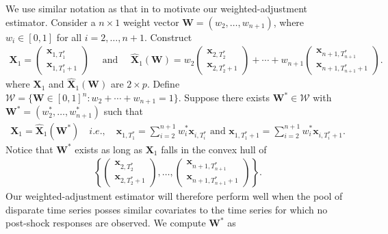 \documentclass[11pt]{article}
\def\mbf#1{\mathbf{#1}} %
\def\mc#1{\mathcal{#1}} %
\theoremstyle{definition}
\begin{document}
We use similar notation as that in \cite{abadie2010synthetic} to motivate 
our weighted-adjustment estimator. Consider a $n\times 1$ weight vector 
$\mbf{W}=(w_2, \ldots, w_{n+1})$, where $w_i\in [0,1]$ for all 
$i = 2, \ldots, n+1$. Construct
\begin{align*}
 \mbf{X}_1 = \begin{pmatrix}
    \mbf{x}_{1, T_1^*} \\ \mbf{x}_{1, T_1^*+1}
  \end{pmatrix}
  \quad \text{ and }
  \quad  \hat{\mbf{X}}_1(\mbf{W})
  = w_2\begin{pmatrix}
     \mbf{x}_{2, T_2^*} \\
      \mbf{x}_{2, T_2^*+1}
   \end{pmatrix} + \cdots + w_{n+1} \begin{pmatrix}
     \mbf{x}_{n+1, T_{n+1}^*} \\
      \mbf{x}_{n+1, T_{n+1}^*+1}
   \end{pmatrix} .
\end{align*}
where $\mbf{X}_1$ and $\hat{\mbf{X}}_1(\mbf{W})$ are $2 \times p$. Define $\mc{W}=\{\mbf{W}\in [0,1]^n \colon w_2+ \cdots + w_{n+1}=1 \}$. 
Suppose there exists $\mbf{W}^*\in \mc{W}$ with 
$\mbf{W}^*=(w_2^*, \ldots, w_{n+1}^*)$ such that
\begin{align}
 \mbf{X}_1=\hat{\mbf{X}}_1(\mbf{W}^*)  \quad i.e., \quad \mbf{x}_{1, T_1^*} = \sum_{i=2}^{n+1} w_i^*\mbf{x}_{i, T_i^*} \text{ and } \mbf{x}_{1, T_1^*+1} = \sum_{i=2}^{n+1} w_i^*\mbf{x}_{i, T_i^*+1}.\label{SCM}
\end{align}
 Notice that $\mbf{W}^*$ exists as long as $\mbf{X}_1$ falls in the convex hull of 
 \begin{align*}
   \left\{ \begin{pmatrix}
     \mbf{x}_{2, T_2^*} \\
      \mbf{x}_{2, T_2^*+1}
   \end{pmatrix}, \ldots, \begin{pmatrix}
     \mbf{x}_{n+1, T_{n+1}^*} \\
      \mbf{x}_{n+1, T_{n+1}^*+1}
   \end{pmatrix} \right\}.
 \end{align*}
Our weighted-adjustment estimator will therefore perform well when the pool of 
disparate time series posses similar covariates to the time series for which 
no post-shock responses are observed. We compute $\mbf{W}^*$ as
\end{document}
